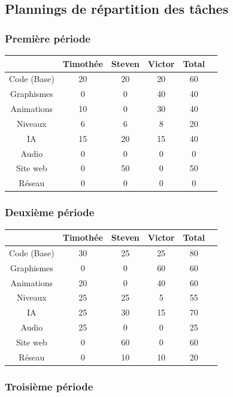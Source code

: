 \documentclass[12pt]{article}
\begin{document}
\subsection{Plannings de répartition des tâches}

\subsubsection{Première période}

\begin{tabular}{|c|c|c|c|c|c|}
\hline
 & Timothée & Steven & Victor & Total\\
\hline
Code (Base) & 20 & 20 & 20 & 60\\
\hline
Graphismes & 0 & 0 & 40 & 40\\
\hline
Animations & 10 & 0 & 30 & 40\\
\hline
Niveaux & 6 & 6 & 8 & 20\\
\hline
IA & 15 & 20 & 15 & 40\\
\hline
Audio & 0 & 0 & 0 & 0\\
\hline
Site web & 0 & 50 & 0 & 50\\
\hline
Réseau & 0 & 0 & 0 & 0\\
\hline
\end{tabular}

\subsubsection{Deuxième période}

\begin{tabular}{|c|c|c|c|c|c|}
\hline
 & Timothée & Steven & Victor & Total\\
\hline
Code (Base) & 30 & 25 & 25 & 80\\
\hline
Graphismes & 0 & 0 & 60 & 60\\
\hline
Animations & 20 & 0 & 40 & 60\\
\hline
Niveaux & 25 & 25 & 5 & 55\\
\hline
IA & 25 & 30 & 15 & 70\\
\hline
Audio & 25 & 0 & 0 & 25\\
\hline
Site web & 0 & 60 & 0 & 60\\
\hline
Réseau & 0 & 10 & 10 & 20\\
\hline
\end{tabular}

\subsubsection{Troisième période}
\end{document}
